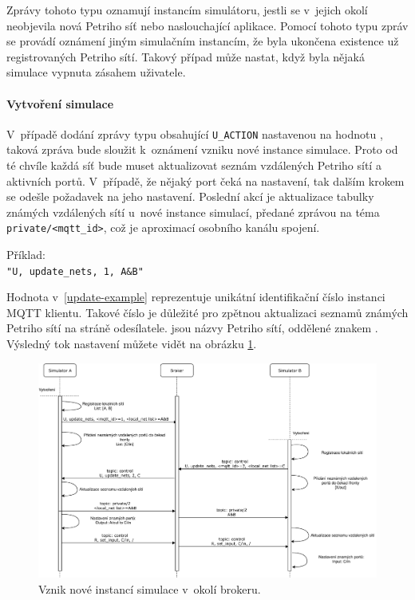 Zprávy tohoto typu oznamují instancím simulátoru, jestli se v~jejich okolí neobjevila nová Petriho síť nebo naslouchající aplikace. Pomocí tohoto typu zpráv se provádí oznámení jiným simulačním instancím, že byla ukončena existence už registrovaných Petriho sítí. Takový případ může nastat, když byla nějaká simulace vypnuta zásahem uživatele.

\paragraph{Vytvoření simulace}

V~případě dodání zprávy typu  obsahující \texttt{U\_ACTION} nastavenou na hodnotu , taková zpráva bude sloužit k~oznámení vzniku nové instance simulace. Proto od té chvíle každá síť bude muset aktualizovat seznám vzdálených Petriho sítí a aktivních portů. V~případě, že nějaký port čeká na nastavení, tak dalším krokem se odešle požadavek na jeho nastavení. Poslední akcí je aktualizace tabulky známých vzdálených sítí u~nové instance simulací, předané zprávou na téma \texttt{private/<mqtt\_id>}, což je aproximací osobního kanálu spojení.

\begin{tabbing}
  \label{update-example}
  Příklad: \= \\
  \>\texttt{"U, update\_nets, 1, A\&B"}
\end{tabbing}

Hodnota  v~\ref{update-example} reprezentuje unikátní identifikační číslo instanci MQTT klientu. Takové číslo je důležité pro zpětnou aktualizaci seznamů známých Petriho sítí na stráně odesílatele.  jsou názvy Petriho sítí, oddělené znakem \uv{\texttt{\&}}. Výsledný tok nastavení můžete vidět na obrázku \ref{sim-register-viz}.

\begin{figure}[hbt]
  \centering
  \includegraphics[width=1\textwidth]{obrazky-figures/sim-register.pdf}
  \caption{Vznik nové instancí simulace v~okolí brokeru.}
  \label{sim-register-viz}
\end{figure}

